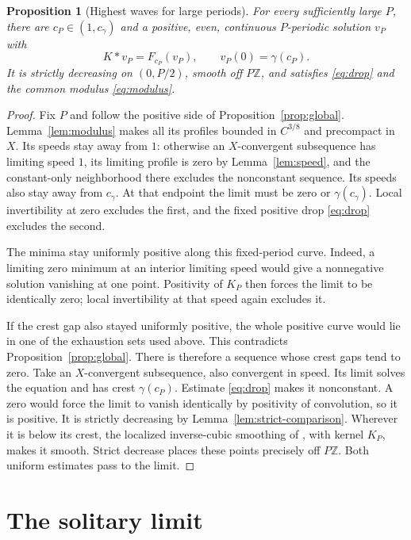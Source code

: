 \documentclass[11pt,a4paper]{article}
\newtheorem{proposition}[theorem]{Proposition}
\theoremstyle{remark}
\newcommand{\cg}{c_\gamma}
\begin{document}
\begin{proposition}[Highest waves for large periods]\label{prop:highest}
For every sufficiently large $P$, there are $c_P\in(1,\cg)$ and a
positive, even, continuous $P$-periodic solution $v_P$ with
\[
 K*v_P=F_{c_P}(v_P),\qquad v_P(0)=\gamma(c_P).
\]
It is strictly decreasing on $(0,P/2)$, smooth off $P\mathbb Z$, and
satisfies \eqref{eq:drop} and the common modulus
\eqref{eq:modulus}.
\end{proposition}
\begin{proof}
Fix $P$ and follow the positive side of Proposition~\ref{prop:global}.
Lemma~\ref{lem:modulus} makes all its profiles bounded in $C^{3/8}$
and precompact in $X$. Its speeds stay away from $1$: otherwise an
$X$-convergent subsequence has limiting speed $1$, its limiting profile
is zero by Lemma~\ref{lem:speed}, and the constant-only neighborhood
there excludes the nonconstant sequence. Its speeds also stay away from
$\cg$. At that endpoint the limit must be zero or $\gamma(\cg)$.
Local invertibility at zero excludes the first, and the fixed positive
drop \eqref{eq:drop} excludes the second.

The minima stay uniformly positive along this fixed-period curve. Indeed,
a limiting zero minimum at an interior limiting speed would give a
nonnegative solution vanishing at one point. Positivity of $K_P$ then
forces the limit to be identically zero; local invertibility at that
speed again excludes it.

If the crest gap also stayed uniformly positive, the whole positive
curve would lie in one of the exhaustion sets used above. This
contradicts Proposition~\ref{prop:global}. There is therefore a sequence
whose crest gaps tend to zero. Take an $X$-convergent subsequence, also
convergent in speed. Its limit solves the equation and has crest
$\gamma(c_P)$. Estimate \eqref{eq:drop} makes it nonconstant. A zero
would force the limit to vanish identically by positivity of convolution,
so it is positive. It is strictly decreasing by
Lemma~\ref{lem:strict-comparison}. Wherever it is below its crest, the
localized inverse-cubic smoothing of \cite[Lemma 4.1]{EJC}, with kernel
$K_P$, makes it smooth. Strict decrease places these points precisely
off $P\mathbb Z$. Both uniform estimates pass to the limit.
\end{proof}

\section{The solitary limit}\label{sec:solitary}
\end{document}
